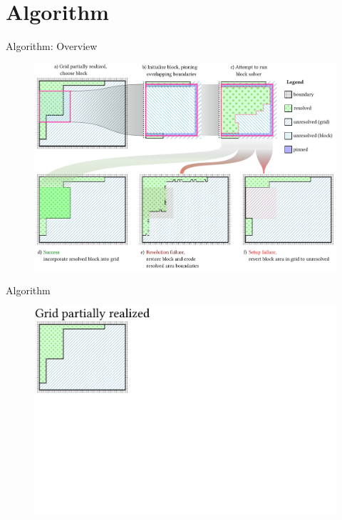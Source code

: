 \documentclass{beamer}
\begin{document}

  \section{Algorithm}

  \begin{frame}[fragile]{Algorithm: Overview }
    \begin{figure}
      \includegraphics[width=\textwidth]{figs/poms_figalg.pdf}
    \end{figure}
  \end{frame}

  \begin{frame}[fragile]{Algorithm}
    \begin{figure}
      \includegraphics[width=\textwidth]{figs/poms_alg0.pdf}
    \end{figure}
  \end{frame}
\end{document}
